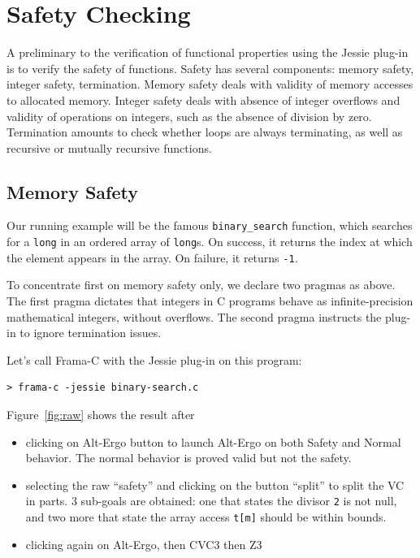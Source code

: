 \documentclass[a4paper,11pt,twoside,openright]{report}
\begin{document}
\chapter{Safety Checking}

A preliminary to the verification of functional properties using the
Jessie plug-in is to verify the safety of functions. Safety has
several components: memory safety, integer safety, termination. Memory
safety deals with validity of memory accesses to allocated
memory. Integer safety deals with absence of integer overflows and
validity of operations on integers, such as the absence of division by
zero. Termination amounts to check whether loops are always
terminating, as well as recursive or mutually recursive functions.

\section{Memory Safety}

Our running example will be the famous \verb|binary_search| function,
which searches for a {\tt long} in an ordered array of {\tt long}s. On
success, it returns the index at which the element appears in the
array. On failure, it returns \verb|-1|.



To concentrate first on memory safety only, we declare two pragmas as
above. The first pragma dictates that integers in C programs behave as
infinite-precision mathematical integers, without overflows. The
second pragma instructs the plug-in to ignore termination issues.

Let's call Frama-C with the Jessie plug-in on this program:

\begin{verbatim}
> frama-c -jessie binary-search.c
\end{verbatim}

Figure~\ref{fig:raw} shows the result after
\begin{itemize}
\item clicking on Alt-Ergo button to launch Alt-Ergo on both Safety
  and Normal behavior. The normal behavior is proved valid but not the safety.
\item selecting the raw ``safety'' and clicking on the button
  ``split'' to split the VC in parts. 3 sub-goals are obtained: one that states the divisor \verb|2| is not null, and two more that state the
array access \verb|t[m]| should be within bounds. 
\item clicking again on Alt-Ergo, then CVC3 then Z3
\end{itemize}
\end{document}
